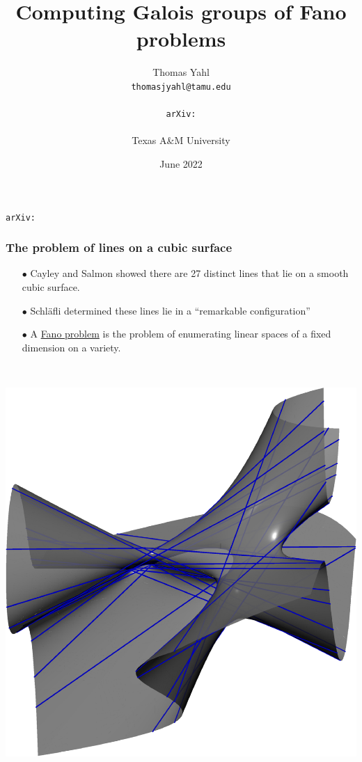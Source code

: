 \documentclass{beamer}
\title{Computing Galois groups of Fano problems}
\author{Thomas Yahl\\  \texttt{thomasjyahl@tamu.edu}\\ \vspace{-.1cm} \\ \texttt{arXiv:}\\ \vspace{-.1cm} \\ Texas A\&M University}
\date{June 2022}
\theoremstyle{definition}
\newcommand{\blue}[1]{{\color{black!15!blue}\underline{#1}}}
\begin{document}
\begin{frame}
\titlepage

\texttt{arXiv:}
\end{frame}



\begin{frame}
\frametitle{The problem of lines on a cubic surface}
\hspace{-.8cm}
\begin{minipage}{.55\textwidth}
\begin{enumerate}
\item[$\bullet$] Cayley and Salmon showed there are 27 distinct lines that lie on a smooth cubic surface.

\item[$\bullet$] Schl\"{a}fli determined these lines lie in a ``remarkable configuration'' 

\item[$\bullet$] A \blue{Fano problem} is the problem of enumerating linear spaces of a fixed dimension on a variety.
\end{enumerate}
\end{minipage}
%
\begin{minipage}{.02\textwidth}
~
\end{minipage}
%
\begin{minipage}{.4\textwidth}
\begin{center}
\includegraphics[scale=.32]{figures/27lines.pdf}
\end{center}
\end{minipage}


\end{frame}
\end{document}
